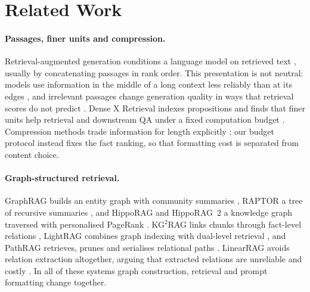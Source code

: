 \section{Related Work}
\label{sec:related}

\paragraph{Passages, finer units and compression.}
Retrieval-augmented generation conditions a language model on retrieved text \citep{lewis2020rag}, usually by concatenating passages in rank order. This presentation is not neutral: models use information in the middle of a long context less reliably than at its edges \citep{liu2024lost}, and irrelevant passages change generation quality in ways that retrieval scores do not predict \citep{cuconasu2024noise}. Dense X Retrieval indexes propositions and finds that finer units help retrieval and downstream QA under a fixed computation budget \citep{chen2024densex}. Compression methods trade information for length explicitly \citep{jiang2024longllmlingua,jeong2025ecorag}; our budget protocol instead fixes the fact ranking, so that formatting cost is separated from content choice.

\paragraph{Graph-structured retrieval.}
GraphRAG builds an entity graph with community summaries \citep{edge2024graphrag}, RAPTOR a tree of recursive summaries \citep{sarthi2024raptor}, and HippoRAG and HippoRAG~2 a knowledge graph traversed with personalised PageRank \citep{gutierrez2024hipporag,gutierrez2025hipporag2}. KG$^2$RAG links chunks through fact-level relations \citep{zhu2025kg2rag}, LightRAG combines graph indexing with dual-level retrieval \citep{guo2024lightrag}, and PathRAG retrieves, prunes and serialises relational paths \citep{chen2026pathrag}. LinearRAG avoids relation extraction altogether, arguing that extracted relations are unreliable and costly \citep{zhuang2026linearrag}. In all of these systems graph construction, retrieval and prompt formatting change together.


